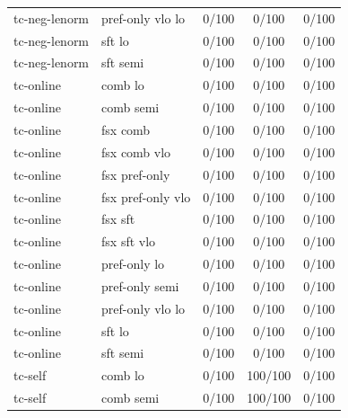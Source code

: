 \documentclass[10pt,landscape]{article}
\begin{document}
\begin{tabular}{llccc}
tc-neg-lenorm & pref-only vlo lo & \cellcolor{missing}0/100 & \cellcolor{missing}0/100 & \cellcolor{missing}0/100 \\
tc-neg-lenorm & sft lo & \cellcolor{missing}0/100 & \cellcolor{missing}0/100 & \cellcolor{missing}0/100 \\
tc-neg-lenorm & sft semi & \cellcolor{missing}0/100 & \cellcolor{missing}0/100 & \cellcolor{missing}0/100 \\
tc-online & comb lo & \cellcolor{missing}0/100 & \cellcolor{missing}0/100 & \cellcolor{missing}0/100 \\
tc-online & comb semi & \cellcolor{missing}0/100 & \cellcolor{missing}0/100 & \cellcolor{missing}0/100 \\
tc-online & fsx comb & \cellcolor{missing}0/100 & \cellcolor{missing}0/100 & \cellcolor{missing}0/100 \\
tc-online & fsx comb vlo & \cellcolor{missing}0/100 & \cellcolor{missing}0/100 & \cellcolor{missing}0/100 \\
tc-online & fsx pref-only & \cellcolor{missing}0/100 & \cellcolor{missing}0/100 & \cellcolor{missing}0/100 \\
tc-online & fsx pref-only vlo & \cellcolor{missing}0/100 & \cellcolor{missing}0/100 & \cellcolor{missing}0/100 \\
tc-online & fsx sft & \cellcolor{missing}0/100 & \cellcolor{missing}0/100 & \cellcolor{missing}0/100 \\
tc-online & fsx sft vlo & \cellcolor{missing}0/100 & \cellcolor{missing}0/100 & \cellcolor{missing}0/100 \\
tc-online & pref-only lo & \cellcolor{missing}0/100 & \cellcolor{missing}0/100 & \cellcolor{missing}0/100 \\
tc-online & pref-only semi & \cellcolor{missing}0/100 & \cellcolor{missing}0/100 & \cellcolor{missing}0/100 \\
tc-online & pref-only vlo lo & \cellcolor{missing}0/100 & \cellcolor{missing}0/100 & \cellcolor{missing}0/100 \\
tc-online & sft lo & \cellcolor{missing}0/100 & \cellcolor{missing}0/100 & \cellcolor{missing}0/100 \\
tc-online & sft semi & \cellcolor{missing}0/100 & \cellcolor{missing}0/100 & \cellcolor{missing}0/100 \\
tc-self & comb lo & \cellcolor{missing}0/100 & \cellcolor{done}100/100 & \cellcolor{missing}0/100 \\
tc-self & comb semi & \cellcolor{missing}0/100 & \cellcolor{done}100/100 & \cellcolor{missing}0/100 \\

\end{tabular}
\end{document}
